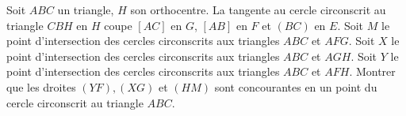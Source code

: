 Soit $ABC$ un triangle, $H$ son orthocentre. La tangente au cercle circonscrit au triangle $CBH$ en $H$ coupe $[AC]$ en $G$, $[AB]$ en $F$ et $(BC)$ en $E$. Soit $M$ le point d'intersection des cercles circonscrits aux triangles $ABC$ et $AFG$. Soit $X$ le point d'intersection des cercles circonscrits aux triangles $ABC$ et $AGH$. Soit $Y$ le point d'intersection des cercles circonscrits aux triangles $ABC$ et $AFH$. Montrer que les droites $(YF), (XG)$ et $(HM)$ sont concourantes en un point du cercle circonscrit au triangle $ABC$.